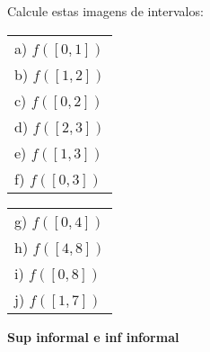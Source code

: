 \documentclass[oneside,12pt]{article}
\begin{document}
\msk

Calcule estas imagens de intervalos:

\msk

\begin{tabular}[t]{l}
a) $f([0,1])$ \\
b) $f([1,2])$ \\
c) $f([0,2])$ \\
d) $f([2,3])$ \\
e) $f([1,3])$ \\
f) $f([0,3])$ \\
\end{tabular}
\qquad
\begin{tabular}[t]{l}
g) $f([0,4])$ \\
h) $f([4,8])$ \\
i) $f([0,8])$ \\
j) $f([1,7])$ \\
\end{tabular}

\newpage

%

{\bf Sup informal e inf informal}


\def\sup {\mathsf{sup}}
\def\supi{\mathsf{supi}}
\def\inf {\mathsf{inf}}
\def\infi{\mathsf{infi}}
\end{document}

